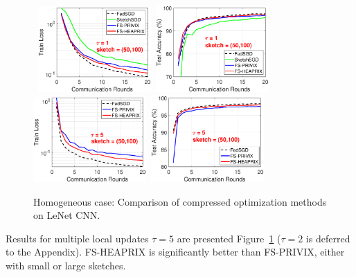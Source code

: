 \documentclass[twoside]{article}
\begin{document}
\begin{figure}[t]
\begin{center}
{		}
		\mbox{\hspace{-0.15in}	
		\includegraphics[width=1.7in]{MNIST_figures/local1_sketch50_iid1_train_loss.eps} \hspace{-0.12in}
		\includegraphics[width=1.7in]{MNIST_figures/local1_sketch50_iid1_test_acc.eps} 
		}
		\mbox{\hspace{-0.15in}	
		\includegraphics[width=1.7in]{MNIST_figures/local5_sketch50_iid1_train_loss.eps}\hspace{-0.12in}
		\includegraphics[width=1.7in]{MNIST_figures/local5_sketch50_iid1_test_acc.eps}
		}
	\end{center}
	\vspace{-0.1in}
	\caption{Homogeneous case: Comparison of compressed optimization methods on LeNet CNN.}
    \label{fig:MNIST-iid1}
\end{figure}
Results for multiple local updates $\tau=5$ are presented Figure~\ref{fig:MNIST-iid1} ($\tau=2$ is deferred to the Appendix). 
FS-HEAPRIX is significantly better than FS-PRIVIX, either with small or large sketches. 
\end{document}
